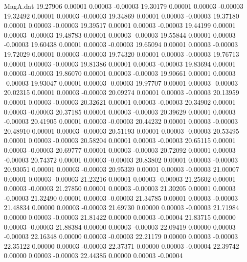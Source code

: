 \begin{filecontents}{MagA.dat}
  19.27906    0.00001    0.00003   -0.00003
  19.30179    0.00001    0.00003   -0.00003
  19.32492    0.00001    0.00003   -0.00003
  19.34869    0.00001    0.00003   -0.00003
  19.37180    0.00001    0.00003   -0.00003
  19.39517    0.00001    0.00003   -0.00003
  19.44199    0.00001    0.00003   -0.00003
  19.48783    0.00001    0.00003   -0.00003
  19.55844    0.00001    0.00003   -0.00003
  19.60438    0.00001    0.00003   -0.00003
  19.65094    0.00001    0.00003   -0.00003
  19.72029    0.00001    0.00003   -0.00003
  19.74320    0.00001    0.00003   -0.00003
  19.76713    0.00001    0.00003   -0.00003
  19.81386    0.00001    0.00003   -0.00003
  19.83694    0.00001    0.00003   -0.00003
  19.86070    0.00001    0.00003   -0.00003
  19.90661    0.00001    0.00003   -0.00003
  19.93047    0.00001    0.00003   -0.00003
  19.97707    0.00001    0.00003   -0.00003
  20.02315    0.00001    0.00003   -0.00003
  20.09274    0.00001    0.00003   -0.00003
  20.13959    0.00001    0.00003   -0.00003
  20.32621    0.00001    0.00003   -0.00003
  20.34902    0.00001    0.00003   -0.00003
  20.37185    0.00001    0.00003   -0.00003
  20.39629    0.00001    0.00003   -0.00003
  20.41905    0.00001    0.00003   -0.00003
  20.44232    0.00001    0.00003   -0.00003
  20.48910    0.00001    0.00003   -0.00003
  20.51193    0.00001    0.00003   -0.00003
  20.53495    0.00001    0.00003   -0.00003
  20.58204    0.00001    0.00003   -0.00003
  20.65115    0.00001    0.00003   -0.00003
  20.69777    0.00001    0.00003   -0.00003
  20.72092    0.00001    0.00003   -0.00003
  20.74372    0.00001    0.00003   -0.00003
  20.83802    0.00001    0.00003   -0.00003
  20.93051    0.00001    0.00003   -0.00003
  20.95339    0.00001    0.00003   -0.00003
  21.00007    0.00001    0.00003   -0.00003
  21.23216    0.00001    0.00003   -0.00003
  21.25602    0.00001    0.00003   -0.00003
  21.27850    0.00001    0.00003   -0.00003
  21.30205    0.00001    0.00003   -0.00003
  21.32490    0.00001    0.00003   -0.00003
  21.34785    0.00001    0.00003   -0.00003
  21.48834    0.00000    0.00003   -0.00003
  21.69730    0.00000    0.00003   -0.00003
  21.71984    0.00000    0.00003   -0.00003
  21.81422    0.00000    0.00003   -0.00004
  21.83715    0.00000    0.00003   -0.00003
  21.88384    0.00000    0.00003   -0.00003
  22.09419    0.00000    0.00003   -0.00003
  22.16348    0.00000    0.00003   -0.00003
  22.21179    0.00000    0.00003   -0.00003
  22.35122    0.00000    0.00003   -0.00003
  22.37371    0.00000    0.00003   -0.00004
  22.39742    0.00000    0.00003   -0.00003
  22.44385    0.00000    0.00003   -0.00004

\end{filecontents}
